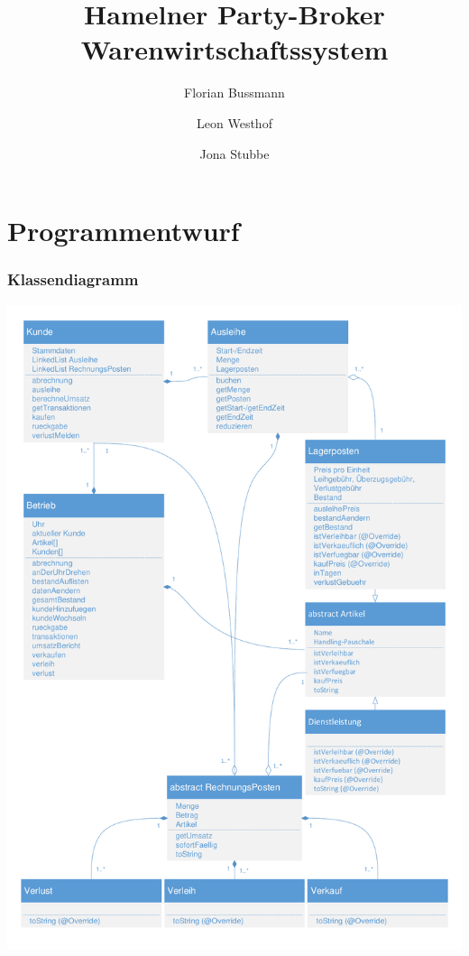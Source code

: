 \documentclass[a4paper,12pt,titlepage]{article}
\title{Hamelner Party-Broker Warenwirtschaftssystem}
\author{Florian Bussmann \and Leon Westhof \and Jona Stubbe}
\begin{document}
\maketitle
\tableofcontents

\part{Programmentwurf}
\section{Klassendiagramm}
\includegraphics[width=\textwidth]{Klassendiagramm.pdf}
\newpage
\end{document}
